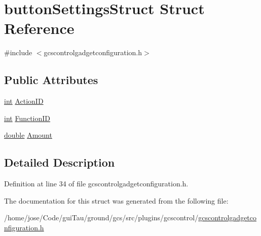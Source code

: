 \hypertarget{structbutton_settings_struct}{\section{button\-Settings\-Struct Struct Reference}
\label{structbutton_settings_struct}
}


{\ttfamily \#include $<$gcscontrolgadgetconfiguration.\-h$>$}

\subsection*{Public Attributes}
\begin{DoxyCompactItemize}
\item 
\hyperlink{ioapi_8h_a787fa3cf048117ba7123753c1e74fcd6}{int} \hyperlink{group___g_c_s_control_gadget_plugin_ga03093dd46af520daf9f990be1e2fe9c6}{Action\-I\-D}
\item 
\hyperlink{ioapi_8h_a787fa3cf048117ba7123753c1e74fcd6}{int} \hyperlink{group___g_c_s_control_gadget_plugin_ga0cf7694f3cc910d158e54851d077dd22}{Function\-I\-D}
\item 
\hyperlink{_super_l_u_support_8h_a8956b2b9f49bf918deed98379d159ca7}{double} \hyperlink{group___g_c_s_control_gadget_plugin_gaaa14aa6512e6e46a95fcfd01c675cbf7}{Amount}
\end{DoxyCompactItemize}


\subsection{Detailed Description}


Definition at line 34 of file gcscontrolgadgetconfiguration.\-h.



The documentation for this struct was generated from the following file\-:\begin{DoxyCompactItemize}
\item 
/home/jose/\-Code/gui\-Tau/ground/gcs/src/plugins/gcscontrol/\hyperlink{gcscontrolgadgetconfiguration_8h}{gcscontrolgadgetconfiguration.\-h}\end{DoxyCompactItemize}
